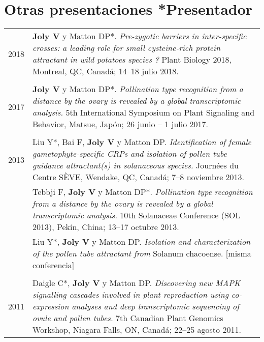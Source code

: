 \documentclass[letterpaper,12pt]{article}
\begin{document}
\vspace{6mm}

\section[Otras presentaciones]{Otras presentaciones \hfill \small{*Presentador}}

\begin{tabularx}{\textwidth}{@{}r|X@{}}

2018
& \textbf{Joly V} y Matton DP*.
  \emph{Pre-zygotic barriers in inter-specific crosses: a leading role for small
  cysteine-rich protein attractant in wild potatoes species ?}
  Plant Biology 2018, Montreal, QC, Canadá;
  14–18 julio 2018.
  \\

\multicolumn{2}{c}{} \\

2017
& \textbf{Joly V} y Matton DP*.
  \emph{Pollination type recognition from a distance by the ovary is revealed
  by a global transcriptomic analysis.}
  5th International Symposium on Plant Signaling and Behavior, Matsue, Japón;
  26 junio – 1 julio 2017.
  \\

\multicolumn{2}{c}{} \\

2013
& Liu Y*, Bai F, \textbf{Joly V} y Matton DP.
  \emph{Identification of female gametophyte-specific CRPs and isolation of
  pollen tube guidance attractant(s) in solanaceous species.}
  Journées du Centre SÈVE, Wendake, QC, Canadá;
  7–8 noviembre 2013.
  \vspace{1.5mm}
  \\

& Tebbji F, \textbf{Joly V} y Matton DP*. \emph{Pollination type recognition
  from a distance by the ovary is revealed by a global transcriptomic analysis.}
  10th Solanaceae Conference (SOL 2013), Pekín, China;
  13–17 octubre 2013.
  \vspace{1.5mm}
  \\

& Liu Y*, \textbf{Joly V} y Matton DP.
  \emph{Isolation and characterization of the pollen tube attractant from}
  Solanum chacoense. [misma conferencia]
  \\

\multicolumn{2}{c}{} \\

2011
& Daigle C*, \textbf{Joly V} y Matton DP.
  \emph{Discovering new MAPK signalling cascades involved in plant reproduction
  using co-expression analyses and deep transcriptomic sequencing of ovule
  and pollen tubes.}
  7th Canadian Plant Genomics Workshop, Niagara Falls, ON, Canadá;
  22–25 agosto 2011.
  \\

\end{tabularx}
\end{document}

